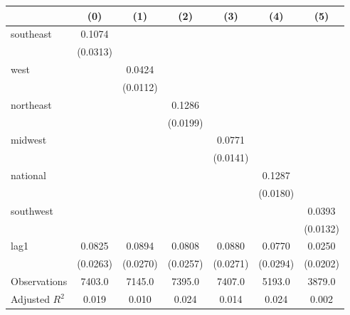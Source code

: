 \begin{tabular}{lcccccc}
\toprule
 & (0) & (1) & (2) & (3) & (4) & (5) \\
\midrule
southeast & 0.1074 &  &  &  &  &  \\
\vspace{0.2cm}
 & (0.0313) &  &  &  &  &  \\
west &  & 0.0424 &  &  &  &  \\
\vspace{0.2cm}
 &  & (0.0112) &  &  &  &  \\
northeast &  &  & 0.1286 &  &  &  \\
\vspace{0.2cm}
 &  &  & (0.0199) &  &  &  \\
midwest &  &  &  & 0.0771 &  &  \\
\vspace{0.2cm}
 &  &  &  & (0.0141) &  &  \\
national &  &  &  &  & 0.1287 &  \\
\vspace{0.2cm}
 &  &  &  &  & (0.0180) &  \\
southwest &  &  &  &  &  & 0.0393 \\
\vspace{0.2cm}
 &  &  &  &  &  & (0.0132) \\
lag1 & 0.0825 & 0.0894 & 0.0808 & 0.0880 & 0.0770 & 0.0250 \\
\vspace{0.2cm}
 & (0.0263) & (0.0270) & (0.0257) & (0.0271) & (0.0294) & (0.0202) \\
\midrule
Observations & 7403.0 & 7145.0 & 7395.0 & 7407.0 & 5193.0 & 3879.0 \\
Adjusted $R^2$ & 0.019 & 0.010 & 0.024 & 0.014 & 0.024 & 0.002 \\
\bottomrule
\end{tabular}